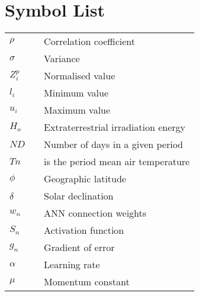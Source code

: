 \chapter*{Symbol List}

\vspace*{-0.5cm}

\onehalfspacing


\noindent
\begin{tabular}{l c p{.85\linewidth}}
$\rho$             & & Correlation coefficient\\

$\sigma$           & & Variance\\

$Z_i^p$		 & & Normalised value\\

$l_i$ 		 & & Minimum value\\

$u_i$		 & & Maximum value\\

$H_o$              & & Extraterrestrial irradiation energy\\
    
$ND$               & & Number of days in a given period\\ 

$Tn$               & & is the period mean air temperature\\

$\phi$             & & Geographic latitude\\

$\delta$          & & Solar declination \\

$w_n$              & & ANN connection weights \\

$S_n$              & & Activation function\\

$g_n$            && Gradient of error\\

$\alpha$        && Learning rate\\

$\mu$            && Momentum constant\\

\end{tabular}
